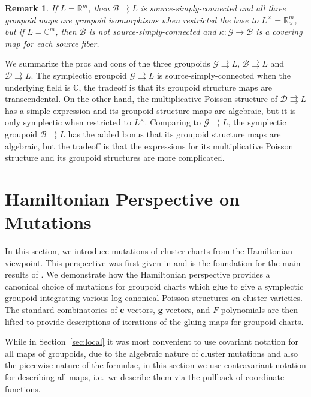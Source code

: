 \documentclass{amsart}
\newtheorem{remark}[theorem]{Remark}
\numberwithin{equation}{section}
\newcommand{\bfc}{\mathbf{c}}
\newcommand{\bfg}{\mathbf{g}}
\newcommand{\cB}{\mathcal{B}}
\newcommand{\cD}{\mathcal{D}}
\newcommand{\cG}{\mathcal{G}}
\newcommand{\CC}{\mathbb{C}}
\newcommand{\RR}{\mathbb{R}}
\newcommand{\rra}{\rightrightarrows}
\begin{document}
\begin{remark}
  If $L = \RR^m$, then $\cB \rra L$ is source-simply-connected and all three groupoid maps are groupoid isomorphisms when restricted the base to $L^\times = \RR_\times^m$, but if $L = \CC^m$, then $\cB$ is not source-simply-connected and $\kappa: \cG \to \cB$ is a covering map for each source fiber.
\end{remark}

We summarize the pros and cons of the three groupoids $\cG \rra L$, $\cB \rra L$ and $\cD \rra L$.
The symplectic groupoid $\cG \rra L$ is source-simply-connected when the underlying field is $\CC$, the tradeoff is that its groupoid structure maps are transcendental.
On the other hand, the multiplicative Poisson structure of $\cD \rra L$ has a simple expression and its groupoid structure maps are algebraic, but it is only symplectic when restricted to $L^\times$.
Comparing to $\cG \rra L$, the symplectic groupoid $\cB \rra L$ has the added bonus that its groupoid structure maps are algebraic, but the tradeoff is that the expressions for its multiplicative Poisson structure and its groupoid structures are more complicated.



\section{Hamiltonian Perspective on Mutations}
\label{sec:mutations}

In this section, we introduce mutations of cluster charts from the Hamiltonian viewpoint.
This perspective was first given in \cite{FG09c} and is the foundation for the main results of \cite{GNR17}.
We demonstrate how the Hamiltonian perspective provides a canonical choice of mutations for groupoid charts which glue to give a symplectic groupoid integrating various log-canonical Poisson structures on cluster varieties.
The standard combinatorics of $\bfc$-vectors, $\bfg$-vectors, and $F$-polynomials are then lifted to provide descriptions of iterations of the gluing maps for groupoid charts.

While in Section~\ref{sec:local} it was most convenient to use covariant notation for all maps of groupoids, due to the algebraic nature of cluster mutations and also the piecewise nature of the formulae, in this section we use contravariant notation for describing all maps, i.e.\ we describe them via the pullback of coordinate functions.
\end{document}
